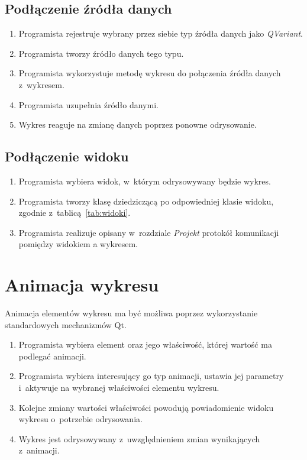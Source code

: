 \subsection{Podłączenie źródła danych}
\begin{enumerate}
\item{Programista rejestruje wybrany przez siebie typ źródła danych jako \textit{QVariant}.}
\item{Programista tworzy źródło danych tego typu.}
\item{Programista wykorzystuje metodę wykresu do połączenia źródła danych z~wykresem.}
\item{Programista uzupełnia źródło danymi.}
\item{Wykres reaguje na zmianę danych poprzez ponowne odrysowanie.}
\end{enumerate}

\subsection{Podłączenie widoku}
\begin{enumerate}
\item{Programista wybiera widok, w~którym odrysowywany będzie wykres.}
\item{Programista tworzy klasę dziedziczącą po odpowiedniej klasie widoku, zgodnie z~tablicą~\ref{tab:widoki}.}
\item{Programista realizuje opisany w~rozdziale \textit{Projekt} protokół komunikacji pomiędzy widokiem a wykresem.}
\end{enumerate}


\section{Animacja wykresu}
Animacja elementów wykresu ma być możliwa poprzez wykorzystanie standardowych mechanizmów Qt.
\begin{enumerate}
\item{Programista wybiera element oraz jego właściwość, której wartość ma podlegać animacji.}
\item{Programista wybiera interesujący go typ animacji, ustawia jej parametry i~aktywuje na wybranej właściwości elementu wykresu.}
\item{Kolejne zmiany wartości właściwości powodują powiadomienie widoku wykresu o~potrzebie odrysowania.}
\item{Wykres jest odrysowywany z~uwzględnieniem zmian wynikających z~animacji.}
\end{enumerate}

